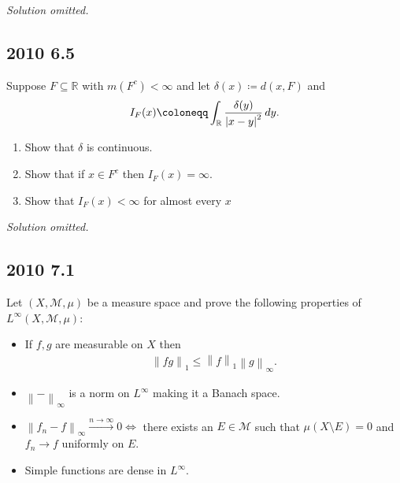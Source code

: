 \emph{Solution omitted.}

\hypertarget{section-2}{%
\subsection{2010 6.5}\label{section-2}}

Suppose \(F \subseteq {\mathbb{R}}\) with \(m(F^c) < \infty\) and let
\(\delta(x) \coloneqq d(x, F)\) and
\begin{align*}
I_F(x) \coloneqq\int_{\mathbb{R}}{ \delta(y) \over {\left\lvert {x-y} \right\rvert}^2 } \,dy
.\end{align*}

\begin{enumerate}
\def\labelenumi{\alph{enumi}.}
\item
  Show that \(\delta\) is continuous.
\item
  Show that if \(x\in F^c\) then \(I_F(x) = \infty\).
\item
  Show that \(I_F(x) < \infty\) for almost every \(x\)
\end{enumerate}

\emph{Solution omitted.}

\hypertarget{section-3}{%
\subsection{2010 7.1}\label{section-3}}

Let \((X, \mathcal{M}, \mu)\) be a measure space and prove the following
properties of \(L^ \infty (X, \mathcal{M}, \mu)\):

\begin{itemize}
\item
  If \(f, g\) are measurable on \(X\) then
  \begin{align*}
  {\left\lVert {fg} \right\rVert}_1 \leq {\left\lVert {f} \right\rVert}_1 {\left\lVert {g} \right\rVert}_{\infty }
  .\end{align*}
\item
  \({\left\lVert {{-}} \right\rVert}_{\infty }\) is a norm on
  \(L^{\infty }\) making it a Banach space.
\item
  \({\left\lVert {f_n - f} \right\rVert}_{\infty } \overset{n\to \infty }\to 0 \iff\)
  there exists an \(E\in \mathcal{M}\) such that
  \(\mu(X\setminus E) = 0\) and \(f_n \to f\) uniformly on \(E\).
\item
  Simple functions are dense in \(L^{\infty }\).
\end{itemize}

